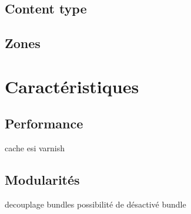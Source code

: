          \section{Content type}
          \section{Zones}  

\chapter{Caractéristiques}
   \section{Performance}
   cache esi
   varnish 
   \section{Modularités}
   decouplage bundles
   possibilité de désactivé bundle
        
        
        